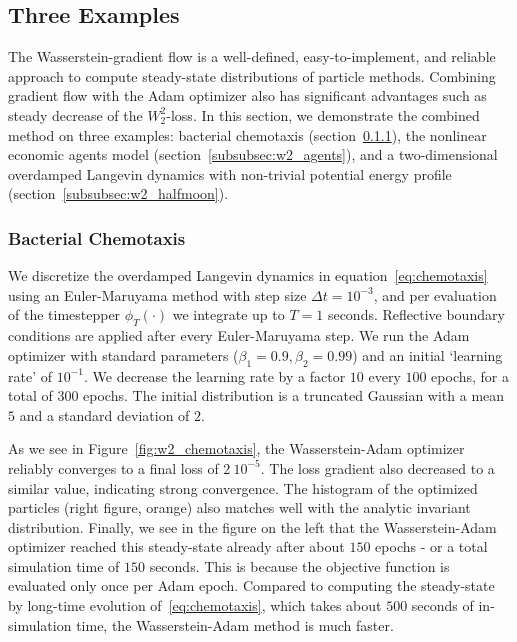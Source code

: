 \documentclass{article}
\begin{document}
\subsection{Three Examples} \label{subsec:wasserstein_results}
The Wasserstein-gradient flow is a well-defined, easy-to-implement, and reliable approach to compute steady-state distributions of particle methods. Combining gradient flow with the Adam optimizer also has significant advantages such as steady decrease of the $W_2^2$-loss. In this section, we demonstrate the combined method on three examples: bacterial chemotaxis (section~\ref{subsubsec:w2_chemotaxis}), the nonlinear economic agents model (section~\ref{subsubsec:w2_agents}), and a two-dimensional overdamped Langevin dynamics with non-trivial potential energy profile (section~\ref{subsubsec:w2_halfmoon}).

\subsubsection{Bacterial Chemotaxis} \label{subsubsec:w2_chemotaxis}
We discretize the overdamped Langevin dynamics in equation~\eqref{eq:chemotaxis} using an Euler-Maruyama method with step size $\Delta t = 10^{-3}$, and per evaluation of the timestepper $\phi_T(\cdot)$ we integrate up to $T = 1$ seconds. Reflective boundary conditions are applied after every Euler-Maruyama step. We run the Adam optimizer with standard parameters ($\beta_1 = 0.9, \beta_2=0.99$) and an initial `learning rate' of $10^{-1}$. We decrease the learning rate by a factor $10$ every $100$ epochs, for a total of $300$ epochs. The initial distribution is a truncated Gaussian with a mean $5$ and a standard deviation of $2$.

As we see in Figure~\ref{fig:w2_chemotaxis}, the Wasserstein-Adam optimizer reliably converges to a final loss of $2 \ 10^{-5}$. The loss gradient also decreased to a similar value, indicating strong convergence. The histogram of the optimized particles (right figure, orange) also matches well with the analytic invariant distribution. Finally, we see in the figure on the left that the Wasserstein-Adam optimizer reached this steady-state already after about $150$ epochs - or a total simulation time of $150$ seconds. This is because the objective function is evaluated only once per Adam epoch. Compared to computing the steady-state by long-time evolution of~\eqref{eq:chemotaxis}, which takes about $500$ seconds of in-simulation time, the Wasserstein-Adam method is much faster.
\end{document}
